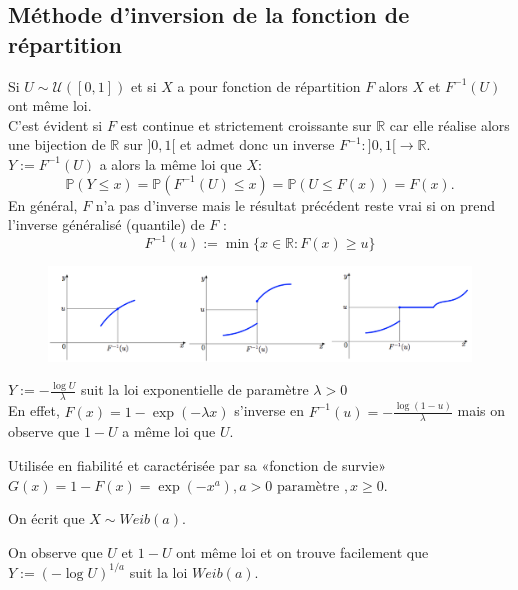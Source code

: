 {\subsection{Méthode d’inversion de la fonction de répartition}

Si $U \sim \mathcal{U}([0,1])$ et si
$X$ a pour fonction de répartition $F$ alors $X$ et $F^{−1}(U)$ ont
même loi.\\

C’est évident si $F$ est continue et strictement croissante sur $\mathbb{R}$
car elle réalise alors une bijection de $\mathbb{R}$ sur $]0,1[$ et admet donc
un inverse $F^{−1}: ]0,1[\rightarrow \mathbb{R}$.\\

$Y:=F^{-1}(U)$ a alors la même loi que $X$:
$$\mathbb{P}(Y\leq x)=\mathbb{P}(F^{-1}(U)\leq x)=\mathbb{P}(U\leq F(x))=F(x).$$
En général, $F$ n’a pas d’inverse mais le résultat précédent reste
vrai si on prend l’inverse généralisé (quantile) de $F$ : $$F^{-1}(u):=\min\{x\in \mathbb{R}:F(x)\geq u\}$$

\begin{figure}[h]
\centering
\includegraphics[width=13cm]{content/figfoncrep.PNG}

\end{figure}


$Y:=-\frac{\log U}{\lambda}$ suit la loi exponentielle de paramètre $\lambda>0$\\

En effet, $F(x)=1-\exp(-\lambda x)$ s'inverse en $F^{-1}(u)=-\frac{\log(1-u)}{\lambda}$ mais on observe que $1-U$ a même
loi que $U$.


Utilisée en fiabilité et caractérisée par sa «fonction de survie» $G(x)=1-F(x)=\exp(-x^{a}), a>0 \text{ paramètre },x\geq 0$.
\vspace{0.05cm}

On écrit que $X\sim Weib(a)$.
\vspace{0.5cm}

On observe que $U$ et $1 − U$ ont même loi et on trouve facilement que $Y:=(-\log U)^{1/a}$ suit la loi $Weib(a)$.

}

